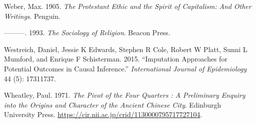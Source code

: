 \documentclass[
  singlecolumn]{report}
\newlength{\cslhangindent}
\newlength{\cslentryspacingunit} %
\newenvironment{CSLReferences}[2] %
 {%
  \setlength{\parindent}{0pt}
  \ifodd #1
  \let\oldpar\par
  \def\par{\hangindent=\cslhangindent\oldpar}
  \fi
  \setlength{\parskip}{#2\cslentryspacingunit}
 }%
 {}
\begin{document}
\begin{CSLReferences}{1}{0}
\leavevmode{}%
Weber, Max. 1905. \emph{The Protestant Ethic and the Spirit of
Capitalism: And Other Writings}. Penguin.

\leavevmode{}%
---------. 1993. \emph{The Sociology of Religion}. Beacon Press.

\leavevmode{}%
Westreich, Daniel, Jessie K Edwards, Stephen R Cole, Robert W Platt,
Sunni L Mumford, and Enrique F Schisterman. 2015. {``Imputation
Approaches for Potential Outcomes in Causal Inference.''}
\emph{International Journal of Epidemiology} 44 (5): 17311737.

\leavevmode{}%
Wheatley, Paul. 1971. \emph{The Pivot of the Four Quarters : A
Preliminary Enquiry into the Origins and Character of the Ancient
Chinese City}. Edinburgh University Press.
\url{https://cir.nii.ac.jp/crid/1130000795717727104}.

\end{CSLReferences}
\end{document}
